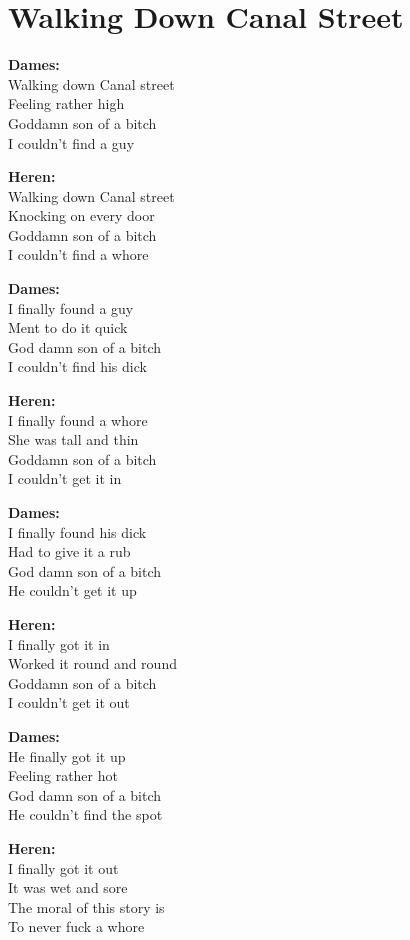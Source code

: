 \section{Walking Down Canal Street}
\textbf{Dames:}\\
Walking down Canal street\\
Feeling rather high\\
Goddamn son of a bitch\\
I couldn’t find a guy

\textbf{Heren:}\\
Walking down Canal street\\
Knocking on every door\\
Goddamn son of a bitch\\
I couldn't find a whore

\textbf{Dames:}\\
I finally found a guy\\ 
Ment to do it quick\\
God damn son of a bitch\\
I couldn’t find his dick

\textbf{Heren:}\\
I finally found a whore\\
She was tall and thin\\
Goddamn son of a bitch\\
I couldn't get it in

\textbf{Dames:}\\
I finally found his dick\\
Had to give it a rub\\
God damn son of a bitch\\
He couldn’t get it up

\textbf{Heren:}\\
I finally got it in\\
Worked it round and round\\
Goddamn son of a bitch\\
I couldn't get it out

\textbf{Dames:}\\
He finally got it up\\
Feeling rather hot\\
God damn son of a bitch\\
He couldn’t find the spot

\textbf{Heren:}\\
I finally got it out\\
It was wet and sore\\
The moral of this story is\\
To never fuck a whore

